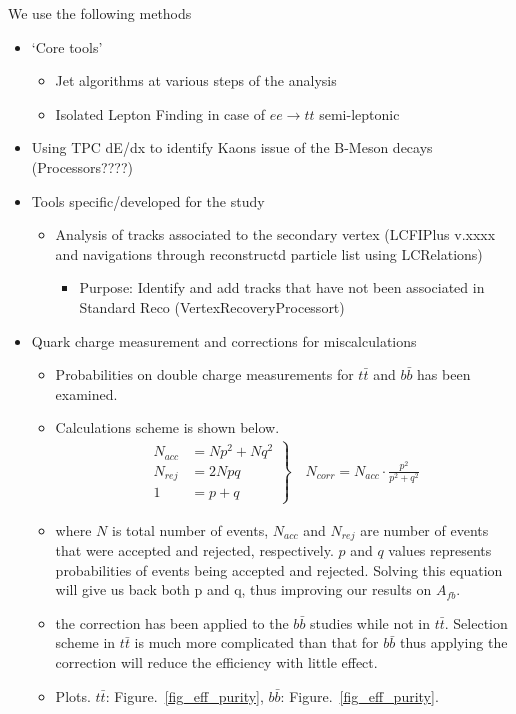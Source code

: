 \documentclass[preprint]{elsarticle}
\begin{document}
We use the following methods
\begin{itemize}

\item `Core tools'
  \begin{itemize}
  \item Jet algorithms at various steps of the analysis 
  \item Isolated Lepton Finding in case of $ee\rightarrow tt$ semi-leptonic
  \end{itemize}
\item Using TPC dE/dx to identify Kaons issue of the B-Meson decays (Processors????)

\item Tools specific/developed for the study
  \begin{itemize}
  \item Analysis of tracks associated to the secondary vertex (LCFIPlus v.xxxx and navigations through reconstructd particle list using LCRelations)
    \begin{itemize}
    \item Purpose: Identify and add tracks that have not been associated in Standard Reco (VertexRecoveryProcessort)
    \end{itemize}
  \end{itemize}

\item Quark charge measurement and corrections for miscalculations

  \begin{itemize}
  \item Probabilities on double charge measurements for $t\bar{t}$ and $b\bar{b}$ has been examined.
  \item Calculations scheme is shown below.
    \begin{align}
      \left.
      \begin{aligned}
        N_{acc} &= Np^2 + Nq^2\\
        N_{rej} &= 2Npq\\
        1 &= p + q
      \end{aligned}
      \right\}
      \quad N_{corr} = N_{acc} \cdot \frac{p^2}{p^2 + q^2}
    \end{align}
  \item where $N$ is total number of events, $N_{acc}$ and $N_{rej}$ are number of events that were accepted and rejected, respectively. $p$ and $q$ values represents probabilities of events being accepted and rejected. Solving this equation will give us back both p and q, thus improving our results on $A_{fb}$.
  \item the correction has been applied to the $b\bar{b}$ studies while not in $t\bar{t}$. Selection scheme in $t\bar{t}$ is much more complicated than that for $b\bar{b}$ thus applying the correction will reduce the efficiency with little effect.
  \item Plots. $t\bar{t}$: Figure.~\ref{fig_eff_purity}, $b\bar{b}$: Figure.~\ref{fig_eff_purity}.
       
  \end{itemize}
  
  \break  
  
\end{itemize}
\end{document}
